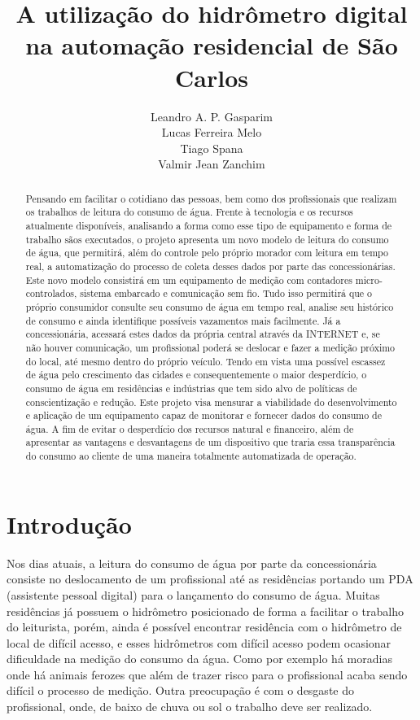 \documentclass[
	article,			%
	11pt,				%
	oneside,			%
	a4paper,			%
	english,			%
	brazil,				%
	sumario=tradicional
	]{abntex2}
\title{A utilização do hidrômetro digital na automação residencial de São Carlos}
\author{
    Leandro A. P. Gasparim \\
    Lucas Ferreira Melo \\
    Tiago Spana \\
    Valmir Jean Zanchim \\
}
\date{}
\begin{document}
\maketitle

\begin{abstract}
   
   Pensando em facilitar o cotidiano das pessoas, bem como dos profissionais que realizam os trabalhos de leitura do consumo de água. Frente à tecnologia e os recursos atualmente disponíveis, analisando a forma como esse tipo de equipamento e forma de trabalho sãos executados, o projeto apresenta um novo modelo de leitura do consumo de água, que permitirá, além do controle pelo próprio morador com leitura em tempo real, a automatização do processo de coleta desses dados por parte das concessionárias. Este novo modelo consistirá em um equipamento de medição com contadores micro-controlados, sistema embarcado e comunicação sem fio. Tudo isso permitirá que o próprio consumidor consulte seu consumo de água em tempo real, analise seu histórico de consumo e ainda identifique possíveis vazamentos mais facilmente. Já a concessionária, acessará estes dados da própria central através da INTERNET e, se não houver comunicação, um profissional poderá se deslocar e fazer a medição próximo do local, até mesmo dentro do próprio veículo.
   Tendo em vista uma possível escassez de água pelo crescimento das cidades e consequentemente o maior desperdício, o consumo de água em residências e indústrias que tem sido alvo de políticas de conscientização e redução.  Este projeto visa mensurar a viabilidade do desenvolvimento e aplicação de um equipamento capaz de monitorar e fornecer dados do consumo de água. A fim de evitar o desperdício dos recursos natural e financeiro, além de apresentar as vantagens e desvantagens de um dispositivo que traria essa transparência do consumo ao cliente de uma maneira totalmente automatizada de operação.
    
\end{abstract}
\newpage
\section{Introdução}

    Nos dias atuais, a leitura do consumo de água por parte da concessionária consiste no deslocamento de um profissional até as residências portando um PDA (assistente pessoal digital) para o lançamento do consumo de água. Muitas residências já possuem o hidrômetro posicionado de forma a facilitar o trabalho do leiturista, porém, ainda é possível encontrar residência com o hidrômetro de local de difícil acesso, e esses hidrômetros com difícil acesso podem ocasionar dificuldade na medição do consumo da água. Como por exemplo há moradias onde há animais ferozes que além de trazer risco para o profissional acaba sendo difícil o processo de medição. Outra preocupação é com o desgaste do profissional, onde, de baixo de chuva ou sol o trabalho deve ser realizado. 
    
\end{document}
